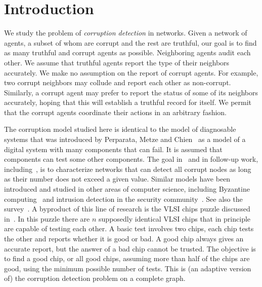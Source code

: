 \documentclass{toc}
\begin{document}
\section{Introduction}
We study the problem of 
%
%
 \emph{corruption detection} in networks. %
Given a network of agents, a subset of whom are 
corrupt and the rest are truthful, our goal is to %
find as many truthful and corrupt agents as possible. 
Neighboring agents audit each other. We assume that 
truthful  agents report the %
%
type  %
of their neighbors accurately. 
We make no assumption on the report of corrupt agents. 
For example, two corrupt neighbors may collude and report each other as
non-corrupt. Similarly, a corrupt agent may 
prefer to report the status of some of 
its neighbors accurately, hoping that this will establish a 
truthful record for itself. 
%
%
%
We permit that the corrupt agents    %
coordinate their actions in an arbitrary fashion. 

The corruption model studied here is identical 
to the model of diagnosable systems 
that was introduced by Perparata, Metze and Chien~\cite{PMC67} 
as a model of a digital system 
with many components that can 
%
fail. 
It is assumed that components can test 
some other components. The goal in~\cite{PMC67} and
%
in follow-up  %
work,   %
including~\cite{HA74,KTA75,KR80},  %
%
is to characterize networks that can detect 
%
%
%
%
%
all  %
corrupt  %
nodes 
as long as their number does not exceed a given value.
%
%
%
%
Similar models
%
have been   %
introduced and studied in other areas of computer science, 
including Byzantine computing~\cite{LSP} and intrusion 
detection in the security community~\cite{mukherjee1994network}. 
See also the survey~\cite{lgorzata2004survey}.
A byproduct of this line of research is the VLSI chips puzzle discussed
in~\cite[Problems~4-6]{CLRS}. In this puzzle there are $n$ supposedly
identical VLSI chips that in principle are capable of
testing each other. A basic test involves two chips,
each chip tests the other and reports whether
it is good or bad. A good chip always
%
%
gives an accurate report,   %
but the answer of a bad chip cannot be trusted.
The objective is to find a good chip, or all good chips, assuming
more than half of the chips are good, using the minimum possible number
of tests.  This is (an adaptive version of) 
the corruption detection problem
on a complete graph. 
%
%
%

%
%
\end{document}
